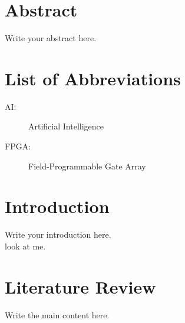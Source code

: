 \documentclass[a4paper,12pt]{article}
\begin{document}
\section*{Abstract}
Write your abstract here.
\newpage

\tableofcontents
\thispagestyle{fancy}
\newpage

\listoffigures
\thispagestyle{fancy}
\newpage

\listoftables
\thispagestyle{fancy}
\newpage

\section*{List of Abbreviations}
\thispagestyle{fancy}
\begin{description}
  \item[AI:] Artificial Intelligence
  \item[FPGA:] Field-Programmable Gate Array
\end{description}
\newpage


\section{Introduction}
Write your introduction here. \\
look at me.

\section{Literature Review}
Write the main content here.
\end{document}

